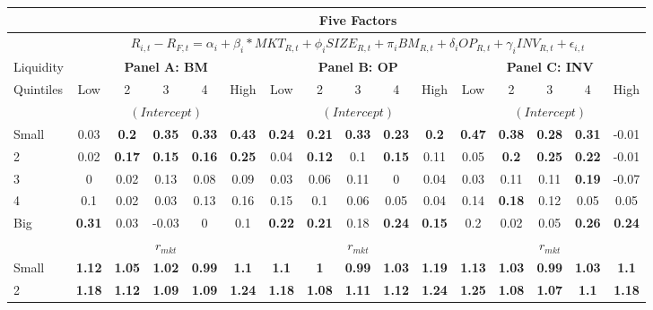 \begin{table}[H]
\tiny
\centering
\begin{tabular}{lccccc|ccccc|ccccc}
\hline
& \multicolumn{15}{c}{Five Factors} \\ \hline
& \multicolumn{15}{c}{\tiny $R_{i,t} - R_{F,t} = \alpha_i+\beta_i*MKT_{R,t} + \phi_iSIZE_{R,t}+\pi_iBM_{R,t} + \delta_iOP_{R,t}+\gamma_iINV_{R,t} + \epsilon_{i,t}$} \\ \hline
Liquidity & \multicolumn{5}{c|}{\textbf{Panel A: BM}} & \multicolumn{5}{c|}{\textbf{Panel B: OP}} & \multicolumn{5}{c}{\textbf{Panel C: INV}} \\
Quintiles & Low & 2 & 3 & 4 & High & Low & 2 & 3 & 4 & High & Low & 2 & 3 & 4 & High \\  \hline
 & \multicolumn{5}{c|}{$(Intercept)$} & \multicolumn{5}{c|}{$(Intercept)$} & \multicolumn{5}{c}{$(Intercept)$} \\
Small & 0.03 & \textbf{0.2} & \textbf{0.35} & \textbf{0.33} & \textbf{0.43} & \textbf{0.24} & \textbf{0.21} & \textbf{0.33} & \textbf{0.23} & \textbf{0.2} & \textbf{0.47} & \textbf{0.38} & \textbf{0.28} & \textbf{0.31} & -0.01 \\
2 & 0.02 & \textbf{0.17} & \textbf{0.15} & \textbf{0.16} & \textbf{0.25} & 0.04 & \textbf{0.12} & 0.1 & \textbf{0.15} & 0.11 & 0.05 & \textbf{0.2} & \textbf{0.25} & \textbf{0.22} & -0.01 \\
3 & 0 & 0.02 & 0.13 & 0.08 & 0.09 & 0.03 & 0.06 & 0.11 & 0 & 0.04 & 0.03 & 0.11 & 0.11 & \textbf{0.19} & -0.07 \\
4 & 0.1 & 0.02 & 0.03 & 0.13 & 0.16 & 0.15 & 0.1 & 0.06 & 0.05 & 0.04 & 0.14 & \textbf{0.18} & 0.12 & 0.05 & 0.05 \\
Big & \textbf{0.31} & 0.03 & -0.03 & 0 & 0.1 & \textbf{0.22} & \textbf{0.21} & 0.18 & \textbf{0.24} & \textbf{0.15} & 0.2 & 0.02 & 0.05 & \textbf{0.26} & \textbf{0.24} \\
 & \multicolumn{5}{c|}{$r_{mkt}$} & \multicolumn{5}{c|}{$r_{mkt}$} & \multicolumn{5}{c}{$r_{mkt}$} \\
Small & \textbf{1.12} & \textbf{1.05} & \textbf{1.02} & \textbf{0.99} & \textbf{1.1} & \textbf{1.1} & \textbf{1} & \textbf{0.99} & \textbf{1.03} & \textbf{1.19} & \textbf{1.13} & \textbf{1.03} & \textbf{0.99} & \textbf{1.03} & \textbf{1.1} \\
2 & \textbf{1.18} & \textbf{1.12} & \textbf{1.09} & \textbf{1.09} & \textbf{1.24} & \textbf{1.18} & \textbf{1.08} & \textbf{1.11} & \textbf{1.12} & \textbf{1.24} & \textbf{1.25} & \textbf{1.08} & \textbf{1.07} & \textbf{1.1} & \textbf{1.18} \\

\end{tabular}
\end{table}
